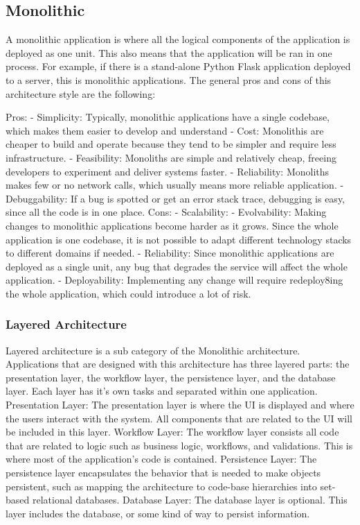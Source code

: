 \subsection[Monolithic]{Monolithic}
A monolithic application is where all the logical components of the application is deployed as one unit. 
This also means that the application will be ran in one process. For example, if there is a stand-alone Python Flask application deployed to a server, 
this is monolithic applications. The general pros and cons of this architecture style are the following:

Pros:
-	Simplicity: Typically, monolithic applications have a single codebase, which makes them easier to develop and understand
-	Cost: Monolithis are cheaper to build and operate because they tend to be simpler and require less infrastructure.
-	Feasibility: Monoliths are simple and relatively cheap, freeing developers to experiment and deliver systems faster.
-	Reliability: Monoliths makes few or no network calls, which usually means more reliable application.
-	Debuggability: If a bug is spotted or get an error stack trace, debugging is easy, since all the code is in one place.
Cons: 
-	Scalability: 
-	Evolvability: Making changes to monolithic applications become harder as it grows. Since the whole application is one codebase, 
  it is not possible to adapt different technology stacks to different domains if needed.
-	Reliability: Since monolithic applications are deployed as a single unit, any bug that degrades the service will affect the whole application.
-	Deployability: Implementing any change will require redeploy8ing the whole application, which could introduce a lot of risk.

\subsubsection[Layered Architecture]{Layered Architecture}

Layered architecture is a sub category of the Monolithic architecture. Applications that are designed with this architecture has three layered parts: 
the presentation layer, the workflow layer, the persistence layer, and the database layer. Each layer has it’s own tasks and separated within one application. 
Presentation Layer:
	The presentation layer is where the UI is displayed and where the users interact with the system.
   All components that are related to the UI will be included in this layer.
Workflow Layer:
	The workflow layer consists all code that are related to logic such as business logic, workflows, and validations. This is where most of the application’s code is contained.
Persistence Layer:
	The persistence layer encapsulates the behavior that is needed to make objects persistent, 
  such as mapping the architecture to code-base hierarchies into set-based relational databases.
Database Layer:
	The database layer is optional. This layer includes the database, or some kind of way to persist information.

